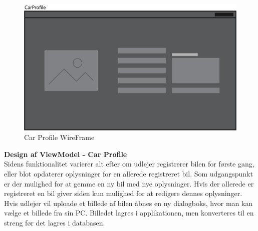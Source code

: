 \documentclass[Rapport/Rapport_main.tex]{subfiles}
\begin{document}
\begin{figure}[H]
    \centering
    \includegraphics[width=\textwidth]{SoftwareDesign/MVVMDesigns/Graphics/CarProfileWireFrame.png}
    \caption{Car Profile WireFrame}
    \label{fig:CarProfileWireFrame}
\end{figure}

\textbf{Design af ViewModel - Car Profile}
\\Sidens funktionalitet varierer alt efter om udlejer registrerer bilen for første gang, eller blot opdaterer oplysninger for en allerede registreret bil. Som udgangspunkt er der mulighed for at gemme en ny bil med nye oplysninger. Hvis der allerede er registreret en bil giver siden kun mulighed for at redigere dennes oplysninger. Hvis udlejer vil uploade et billede af bilen åbnes en ny dialogboks, hvor man kan vælge et billede fra sin PC. Billedet lagres i applikationen, men konverteres til en streng før det lagres i databasen. 
\end{document}
